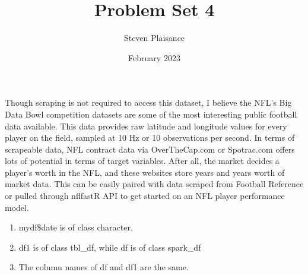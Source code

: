 \documentclass{article}
\title{Problem Set 4}
\author{Steven Plaisance}
\date{February 2023}
\begin{document}
\maketitle

Though scraping is not required to access this dataset, I believe the NFL's Big Data Bowl competition datasets are some of the most interesting public football data available. This data provides raw latitude and longitude values for every player on the field, sampled at 10 Hz or 10 observations per second. 
\linebreak
\linebreak
In terms of scrapeable data, NFL contract data via OverTheCap.com or Spotrac.com offers lots of potential in terms of target variables. After all, the market decides a player's worth in the NFL, and these websites store years and years worth of market data. This can be easily paired with data scraped from Football Reference or pulled through nflfastR API to get started on an NFL player performance model. 

\begin{enumerate}
  \item mydf\$date is of class character.
  \item df1 is of class tbl\_df, while df is of class spark\_df
  \item The column names of df and df1 are the same. 
\end{enumerate}
\end{document}
